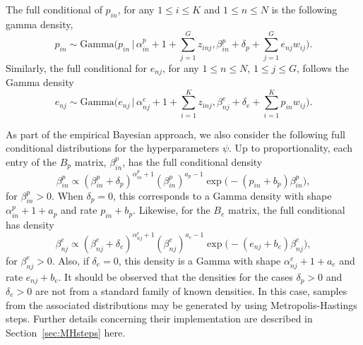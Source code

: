 \documentclass[11pt]{amsart}
\theoremstyle{definition}
\theoremstyle{remark}
\begin{document}
The full conditional of $p_{in}$, for any $1 \leq i\leq K$ and $1\leq
n\leq  N$ is the following gamma density,
\begin{equation}
  \label{eqn:Full_for_P}
  p_{in} 
       \sim 
     \text{Gamma}\Big(p_{in}\,\Big|\, \alpha_{in}^p + 1 +
     \sum_{j=1}^G z_{inj}, \beta_{in}^p + \delta_p +
     \sum_{j=1}^G e_{nj}w_{ij}\Big).\tag{$s_2$}
\end{equation}
Similarly, the full conditional for $e_{nj}$, for any $1\leq n\leq 
N$, $1\leq j\leq G$, follows the Gamma density  
\begin{equation}
  \label{eqn:Full_for_E}
  e_{nj} 
     \sim 
   \text{Gamma}\Big(e_{nj}\,\Big|\, \alpha_{nj}^e + 1 +
   \sum_{i=1}^K z_{inj}, \beta_{nj}^e + \delta_e +
   \sum_{i=1}^K p_{in}w_{ij}\Big).\tag{$s_3$}
\end{equation}


As part of the  empirical Bayesian approach, we also consider the
following full conditional distributions for the hyperparameters
$\psi$. Up to proportionality, each entry of the $B_p$ matrix,
$\beta_{in}^p$,  has the full conditional density
\begin{equation}
 \label{eqn:Full_for_Bp}
 \beta_{in}^p
   \propto
      (\beta_{in}^p + \delta_p)^{\alpha_{in}^p + 1}(\beta_{in}^p)^{a_p
      - 1} \exp\Big(-(p_{in}+b_p)\beta_{in}^p\Big),\tag{$s_4$}
\end{equation}
for $\beta_{in}^p > 0$. When $\delta_p = 0$, this  corresponds  to a
Gamma density with shape $\alpha_{in}^p + 1 + a_p$ and rate $p_{in} +
b_p$.  Likewise, for the $B_e$ matrix, the full conditional has density
\begin{equation}
 \label{eqn:Full_for_Be}
 \beta_{nj}^e
   \propto
      (\beta_{nj}^e + \delta_e)^{\alpha_{nj}^e + 1}(\beta_{nj}^e)^{a_e
      - 1} \exp\Big(-(e_{nj}+b_e)\beta_{nj}^e\Big),\tag{$s_5$}
\end{equation}
for $\beta_{nj}^e > 0$. Also, if $\delta_e = 0$, this density is a
Gamma with shape $\alpha_{nj}^e + 1+ a_e$ and rate $e_{nj}+b_e$. It
should be observed that the densities for the cases $\delta_p > 0$ and
$\delta_e > 0$ are not from a standard family of known densities. In
this case, samples from the associated distributions may be generated
by using Metropolis-Hastings steps. Further details concerning their
implementation are described in Section~\ref{sec:MHsteps} here.
\end{document}
